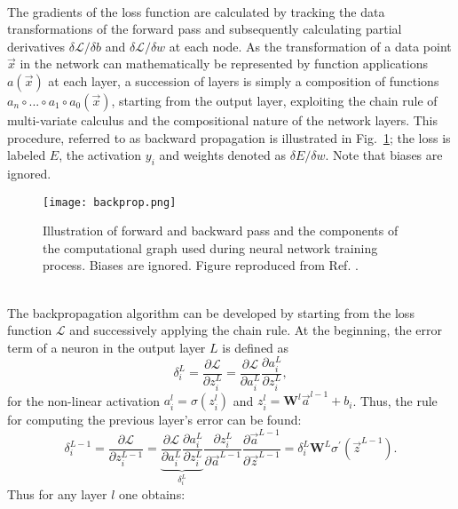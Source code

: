 \documentclass[a4paper, 12pt, twoside]{article}
\begin{document}
\begin{appendices}
\\
The gradients of the loss function are calculated by tracking the data transformations of the forward pass and subsequently calculating partial derivatives $\delta\mathscr{L}/\delta b$ and $\delta\mathscr{L}/\delta w$ at each node. As the transformation of a data point $\vec{x}$ in the network can mathematically be represented by function applications $a(\vec{x})$ at each layer, a succession of layers is simply a composition of functions $a_n\circ ...\circ a_1\circ a_0(\vec{x})$,  starting from the output layer, exploiting the chain rule of multi-variate calculus and the compositional nature of the network layers. This procedure, referred to as backward propagation is illustrated in Fig.~\ref{fig:bp}; the loss is labeled $E$, the activation $y_i$ and weights denoted as $\delta E/\delta w$. Note that biases are ignored.\\
\begin{figure}[htp]
			\begin{center}
				\texttt{[image: backprop.png]}
				\caption{Illustration of forward and backward pass and the components of the computational graph used during neural network training process. Biases are ignored. Figure reproduced from Ref. \cite{baydin18}.}
				\label{fig:bp}
			\end{center}
\end{figure}
\\
The backpropagation algorithm can be developed by starting from the loss function $\mathscr{L}$ and successively applying the chain rule. At the beginning, the error term of a neuron in the output layer $L$ is defined as
\begin{equation}
	\delta_i^L = \frac{\partial\mathscr{L}}{\partial z_i^L} = \frac{\partial\mathscr{L}}{\partial a_i^L}\frac{\partial a_i^L}{\partial z_i^L},
	\label{eq:del}
\end{equation}
for the non-linear activation $a_{i}^{l} = \sigma(z_{i}^{l})$ and $z_{i}^{l}=\bm{W}^l\vec{a}^{l-1}+b_i$. Thus, the rule for computing the previous layer's error can be found:
\begin{equation}
	\delta_i^{L-1}=\frac{\partial\mathscr{L}}{\partial z_i^{L-1}}=\underbrace{\frac{\partial\mathscr{L}}{\partial a_i^L}\frac{\partial a_i^L}{\partial z_i^L}}_{\delta_i^L}\frac{\partial z_i^L}{\partial \vec{a}^{L-1}}\frac{\partial \vec{a}^{L-1}}{\partial \vec{z}^{L-1}}=\delta_i^L\bm{W}^{L}\sigma^\prime(\vec{z}^{L-1}).
\end{equation}
Thus for any layer $l$ one obtains:
\begin{equation}

\end{equation}
\end{appendices}
\end{document}
